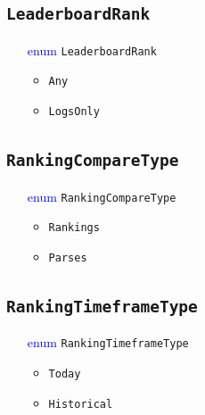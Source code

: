 \documentclass[10pt, a4paper]{memoir}
\numberwithin{equation}{section}
\theoremstyle{plain}
\theoremstyle{defp}
\theoremstyle{dotless}
\theoremstyle{definition}
\theoremstyle{dotless}
\theoremstyle{dotless}
\theoremstyle{defp}
\theoremstyle{defp}
\theoremstyle{be}          %
\theoremstyle{defp}
\newcommand\ttt[1]{\texttt{#1}}
\begin{document}
\subsection{\ttt{LeaderboardRank}}\label{sec:LeaderboardRank}
\begin{itemize}[noitemsep,topsep=1pt]
\item[\textcolor{blue}{enum}] \ttt{LeaderboardRank}
\begin{itemize}[itemsep=1pt,topsep=1pt]
\item \ttt{Any}
\item \ttt{LogsOnly}
\end{itemize}
\end{itemize}


\subsection{\ttt{RankingCompareType}}\label{sec:RankingCompareType}
\begin{itemize}[noitemsep,topsep=1pt]
\item[\textcolor{blue}{enum}] \ttt{RankingCompareType}
\begin{itemize}[itemsep=1pt,topsep=1pt]
\item \ttt{Rankings}
\item \ttt{Parses}
\end{itemize}
\end{itemize}


\subsection{\ttt{RankingTimeframeType}}\label{sec:RankingTimeframeType}
\begin{itemize}[noitemsep,topsep=1pt]
\item[\textcolor{blue}{enum}] \ttt{RankingTimeframeType}
\begin{itemize}[itemsep=1pt,topsep=1pt]
\item \ttt{Today}
\item \ttt{Historical}
\end{itemize}
\end{itemize}
\end{document}
